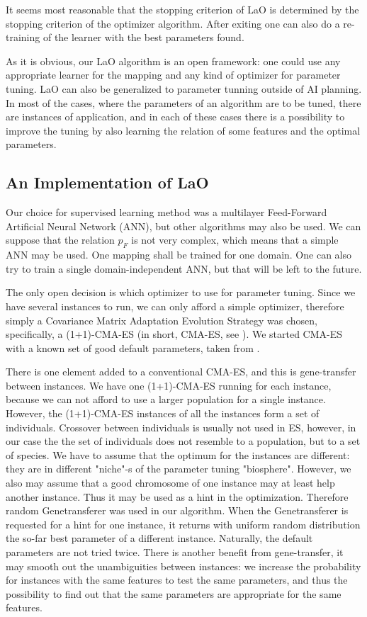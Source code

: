 \documentclass{acm_proc_article-sp}
\begin{document}
It seems most reasonable that the stopping criterion of LaO is determined by the stopping criterion of the optimizer algorithm. After exiting one can also do a re-training of the learner with the best parameters found.

As it is obvious, our LaO algorithm is an open framework: one could use any appropriate learner for the mapping and any kind of optimizer for parameter tuning. LaO can also be generalized to parameter tunning outside of AI planning. In most of the cases, where the parameters of an algorithm are to be tuned, there are instances of application, and in each of these cases there is a possibility to improve the tuning by also learning the relation of some features and the optimal parameters.

\subsection{An Implementation of LaO}

Our choice for supervised learning method was a multilayer Feed-Forward Artificial Neural Network (ANN), but other algorithms may also be used. We can suppose that the relation \begin{math}p_F\end{math} is not very complex, which means that a simple ANN may be used. One mapping shall be trained for one domain. One can also try to train a single domain-independent ANN, but that will be left to the future.

The only open decision is which optimizer to use for parameter tuning. Since we have several instances to run, we can only afford a simple optimizer, therefore simply a Covariance Matrix Adaptation Evolution Strategy was chosen, specifically, a (1+1)-CMA-ES (in short, CMA-ES, see \cite{hansen2001ecj}). We started CMA-ES with a known set of good default parameters, taken from \cite{BibGECCO:2010}.

There is one element added to a conventional CMA-ES, and this is gene-transfer between instances. We have one (1+1)-CMA-ES running for each instance, because we can not afford to use a larger population for a single instance. However, the (1+1)-CMA-ES instances of all the instances form a set of individuals. Crossover between individuals is usually not used in ES, however, in our case the the set of individuals does not resemble to a population, but to a set of species. We have to assume that the optimum for the instances are different: they are in different "niche"-s of the parameter tuning "biosphere". However, we also may assume that a good chromosome of one instance may at least help another instance. Thus it may be used as a hint in the optimization. Therefore random Genetransferer was used in our algorithm. When the Genetransferer is requested for a hint for one instance, it returns with uniform random distribution the so-far best parameter of a different instance. Naturally, the default parameters are not tried twice. There is another benefit from gene-transfer, it may smooth out the unambiguities between instances: we increase the probability for instances with the same features to test the same parameters, and thus the possibility to find out that the same parameters are appropriate for the same features.
\end{document}
